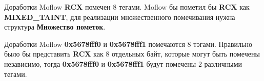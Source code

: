 \documentclass[10pt]{beamer}
\begin{document}
\begin{frame}[fragile]{Доработки Moflow}
    \textbf{RCX} помечен $8$ тегами. Moflow бы пометил бы
    \textbf{RCX} как \textbf{MIXED\_TAINT}, для реализации множественного помечивания нужна  структура \textbf{Множество пометок}.


\end{frame}

\begin{frame}[fragile]{Доработки Moflow}
    \textbf{0x5678fff0} и \textbf{0x5678fff1} помечаются $8$ тэгами. Правильно было бы представить \textbf{RCX} как 8 отдельных байт, которые могут быть помечены независимо, тогда \textbf{0x5678fff0} и \textbf{0x5678fff1} будут помечены $2$ различными тегами.

\end{frame}
\end{document}
